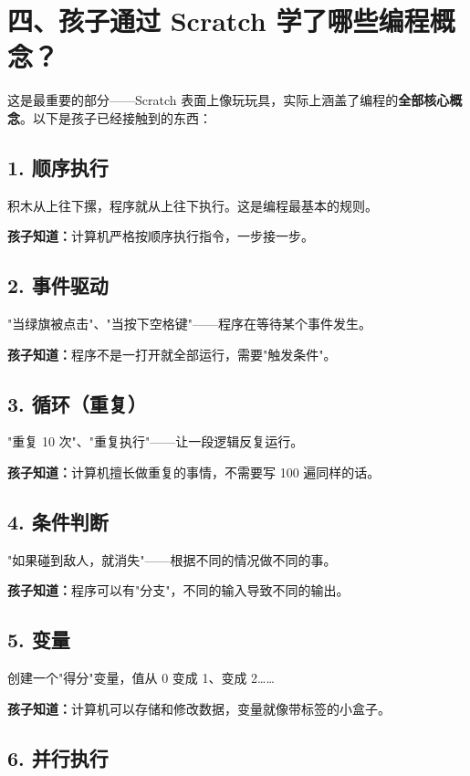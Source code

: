 \documentclass[a4paper,12pt]{ctexart}
\begin{document}
\section*{四、孩子通过 Scratch 学了哪些编程概念？}

这是最重要的部分——Scratch 表面上像玩玩具，实际上涵盖了编程的\textbf{全部核心概念}。以下是孩子已经接触到的东西：

\subsection*{1. 顺序执行}

积木从上往下摞，程序就从上往下执行。这是编程最基本的规则。

\textbf{孩子知道：}计算机严格按顺序执行指令，一步接一步。

\subsection*{2. 事件驱动}

"当绿旗被点击"、"当按下空格键"——程序在等待某个事件发生。

\textbf{孩子知道：}程序不是一打开就全部运行，需要"触发条件"。

\subsection*{3. 循环（重复）}

"重复 10 次"、"重复执行"——让一段逻辑反复运行。

\textbf{孩子知道：}计算机擅长做重复的事情，不需要写 100 遍同样的话。

\subsection*{4. 条件判断}

"如果碰到敌人，就消失"——根据不同的情况做不同的事。

\textbf{孩子知道：}程序可以有"分支"，不同的输入导致不同的输出。

\subsection*{5. 变量}

创建一个"得分"变量，值从 0 变成 1、变成 2……

\textbf{孩子知道：}计算机可以存储和修改数据，变量就像带标签的小盒子。

\subsection*{6. 并行执行}
\end{document}
